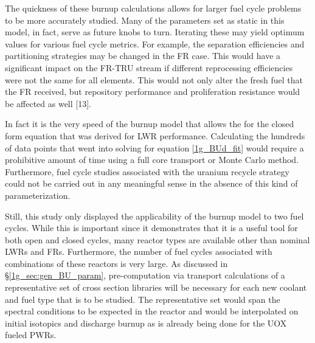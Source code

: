 The quickness of these burnup calculations allows for larger fuel cycle problems to be 
more accurately studied.  Many of the parameters set as static in this model, in fact, 
serve as future knobs to turn.  Iterating these may yield optimum values for various fuel 
cycle metrics.  For example, the separation efficiencies and partitioning strategies may be 
changed in the FR case.  This would have a significant impact on the FR-TRU stream if 
different reprocessing efficiencies were not the same for all elements.  This would not 
only alter the fresh fuel that the FR received, but repository performance and proliferation 
resistance would be affected as well [13].  

In fact it is the very speed of the burnup model that allows the for the closed form equation 
that was derived for LWR performance.  Calculating the hundreds of data points that went into 
solving for equation \ref{1g_BUd_fit} would require a prohibitive amount of time using a full 
core transport or Monte Carlo method.  Furthermore, fuel cycle studies associated with the 
uranium recycle strategy could not be carried out in any meaningful sense in the absence of 
this kind of parameterization.

Still, this study only displayed the applicability of the burnup model to two fuel cycles.  
While this is important since it demonstrates that it is a useful tool for both open and 
closed cycles, many reactor types are available other than nominal LWRs and FRs.  Furthermore, 
the number of fuel cycles associated with combinations of these reactors is very large.  
As discussed in \S \ref{1g_sec:gen_BU_param}, pre-computation via transport calculations of a 
representative set of cross section libraries will be necessary for each new coolant and fuel 
type that is to be studied.  The representative set would span the spectral conditions to be 
expected in the reactor and would be interpolated on initial isotopics and discharge burnup 
as is already being done for the UOX fueled PWRs.

